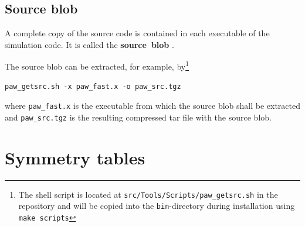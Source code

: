 \documentclass[final,12pt,makeidx,DIV=calc]{article}
\begin{document}
{{{{{{%
\subsection{Source blob}
A complete copy of the source code is contained in each executable of
the simulation code. It is called the \textbf{source~blob}
.

The source blob can be extracted, for example, by\footnote{The shell
script is located at \texttt{src/Tools/Scripts/paw\_getsrc.sh} in the
repository and will be copied into the \texttt{bin}-directory during
installation using \texttt{make scripts}}
\begin{verbatim}
paw_getsrc.sh -x paw_fast.x -o paw_src.tgz
\end{verbatim}
where \verb|paw_fast.x| is the executable from which the source blob
shall be extracted and \verb|paw_src.tgz| is the resulting compressed
tar file with the source blob.


\newpage
\section{Symmetry tables}\label{section:symmetry_tables}
}}}}}}
\end{document}
